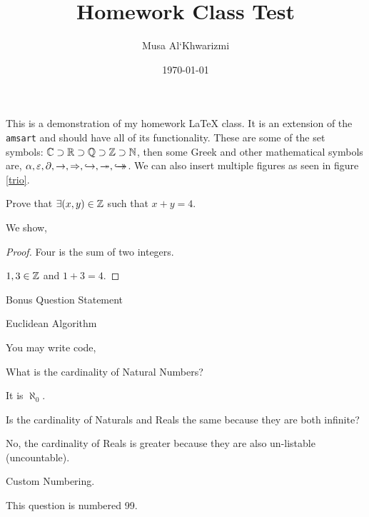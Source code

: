 \documentclass{homework}
\author{Musa Al`Khwarizmi}
\date{\today}
\title{Homework Class Test}
\begin{document}
 \maketitle

This is a demonstration of my homework \LaTeX{} class. It is an extension of the \texttt{amsart} and should have all of its functionality. These are some of the set symbols: $\mathbb{C} \supset \mathbb{R} \supset \mathbb{Q} \supset \mathbb{Z} \supset \mathbb{N}$, then some Greek and other mathematical symbols are, $\alpha, \varepsilon, \partial, \rightarrow, \Rightarrow, \hookrightarrow, \twoheadrightarrow, \hookrightarrow\mathrel{\mspace{-15mu}}\rightarrow$. We can also insert multiple figures as seen in figure \ref{trio}.


\begin{question} Prove that $\exists (x,y) \in \mathbb{Z}$ such that $x+y = 4$.

  We show,
  \begin{proof} Four is the sum of two integers.
    
    $1,3 \in \mathbb{Z}$ and $1+3=4$.
  \end{proof}
\end{question}


\begin{bonus} Bonus Question Statement 

  \lipsum[2] 
\end{bonus}

\begin{bonus} Euclidean Algorithm

  You may write code,
  
  
\end{bonus}

\begin{question} What is the cardinality of Natural Numbers?
    
  It is $\aleph_0$.
\end{question}

\begin{question} Is the cardinality of Naturals and Reals the same because they are both infinite?

  No, the cardinality of Reals is greater because they are also un-listable (uncountable).
\end{question}

\begin{question}[99] Custom Numbering.

  This question is numbered 99.
\end{question}
\end{document}
